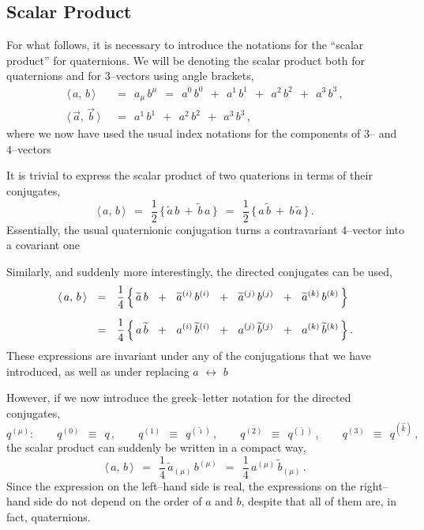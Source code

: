 \documentclass[epsfig,12pt]{article}
\def\beq{\begin{equation}}
\def\eeq{\end{equation}}
\newcommand{\wt}{\widetilde}
\newcommand{\ii}{\hat\imath}
\newcommand{\jj}{\hat\jmath}
\newcommand{\kk}{\hat k}
\begin{document}
\subsection{Scalar Product}
	
	For what follows, it is necessary to introduce the notations for the ``scalar product'' for quaternions.
	We will be denoting the scalar product both for quaternions and for $ 3 $--vectors using angle brackets,
\begin{align*}
%
	\langle\, a,\, b \,\rangle		& ~~=~~		a_\mu\, b^\mu	~~=~~	
		a^0\, b^0  ~~+~~  a^1\, b^1  ~~+~~  a^2\, b^2  ~~+~~  a^3\, b^3\,,
	\\[2mm]
%
	\langle\, \vec a,\, \vec b \,\rangle	& ~~=~~  a^1\, b^1  ~~+~~  a^2\, b^2  ~~+~~  a^3\, b^3\,,
\end{align*}
	where we now have used the usual index notations for the components of $ 3 $-- and $ 4 $--vectors

	It is trivial to express the scalar product of two quaterions in terms of their conjugates,
\[
	\langle\, a,\, b \,\rangle
	~~=~~	\frac 1 2\, \Big\{\, \wt a\, b  ~+~  \wt b\, a \,\Big\}
	~~=~~	\frac 1 2\, \Big\{\, a\, \wt b  ~+~  b\, \wt a \,\Big\}\,.
\]
	Essentially, the usual quaternionic conjugation turns a contravariant $ 4 $--vector into a covariant one

	Similarly, and suddenly more interestingly, the directed conjugates can be used,
\begin{align}
%
\notag
	\langle\, a,\, b \,\rangle
	& ~~=~~	\frac 1 4\, \Big\{\, \wt a\, b  ~~+~~  \wt a^{(i)}\, b^{(i)}  ~~+~~  \wt a^{(j)}\, b^{(j)}  ~~+~~  \wt a^{(k)}\, b^{(k)} \,\Big\}
	\\[2mm]
%
	& ~~=~~	\frac 1 4\, \Big\{\, a\, \wt b  ~~+~~  a^{(i)}\, \wt b^{(i)}  ~~+~~  a^{(j)}\, \wt b^{(j)}  ~~+~~  a^{(k)}\, \wt b^{(k)} \,\Big\}
	\,.
\end{align}
	These expressions are invariant under any of the conjugations that we have introduced, as well as
	under replacing $ a $ $ \leftrightarrow $ $ b $

	However, if we now introduce the greek--letter notation for the directed conjugates,
\[
	q^{(\mu)}:\qquad	q^{(0)}		~~\equiv~~	q\,,\qquad
	q^{(1)}		~~\equiv~~		q^{(\ii)}\,,\qquad
	q^{(2)}		~~\equiv~~		q^{(\jj)}\,,\qquad
	q^{(3)}		~~\equiv~~		q^{(\kk)}\,,
\]
	the scalar product can suddenly be written in a compact way,
\beq
\label{scalar-product}
	\langle\, a,\, b \,\rangle
	~~=~~	\frac 1 4\, \wt a_{(\mu)}\, b^{(\mu)}
	~~=~~	\frac 1 4\, a^{(\mu)}\, \wt b_{(\mu)}\,.
\eeq
	Since the expression on the left--hand side is real,
	the expressions on the right--hand side do not depend on the order of $ a $ and $ b $,
	despite that all of them are, in fact, quaternions.
\end{document}
